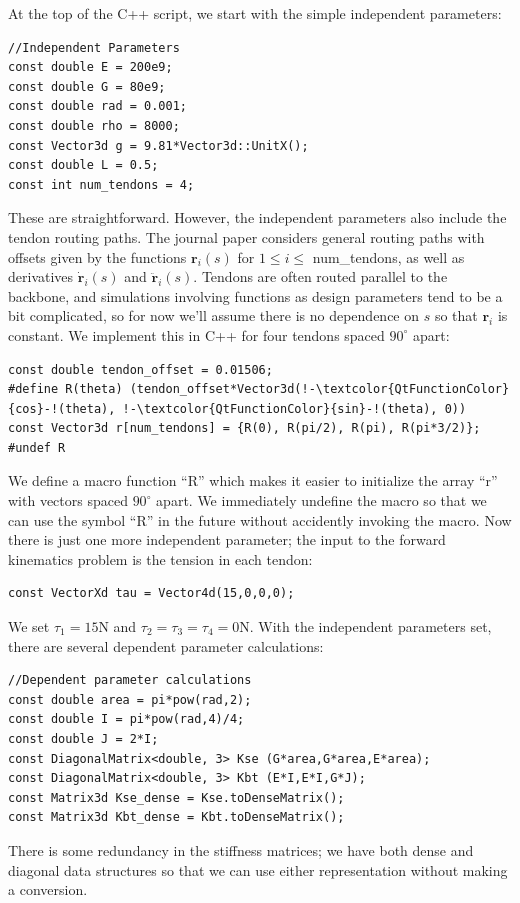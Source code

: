 \documentclass[12pt]{article}
\begin{document}
At the top of the C++ script, we start with the simple independent parameters:
\begin{lstlisting}
//Independent Parameters
const double E = 200e9;
const double G = 80e9;
const double rad = 0.001;
const double rho = 8000;
const Vector3d g = 9.81*Vector3d::UnitX();
const double L = 0.5;
const int num_tendons = 4;
\end{lstlisting}
These are straightforward. However, the independent parameters also include the tendon routing paths. The journal paper considers general routing paths with offsets given by the functions $\boldsymbol{r}_i(s)$ for $1 \leq i \leq$ num\_tendons, as well as derivatives $\dot{\boldsymbol{r}}_i(s)$ and $\ddot{\boldsymbol{r}}_i(s)$. Tendons are often routed parallel to the backbone, and simulations involving functions as design parameters tend to be a bit complicated, so for now we'll assume there is no dependence on $s$ so that $\boldsymbol{r}_i$ is constant. We implement this in C++ for four tendons spaced $90^\circ$ apart:
\begin{lstlisting}
const double tendon_offset = 0.01506;
#define R(theta) (tendon_offset*Vector3d(!-\textcolor{QtFunctionColor}{cos}-!(theta), !-\textcolor{QtFunctionColor}{sin}-!(theta), 0))
const Vector3d r[num_tendons] = {R(0), R(pi/2), R(pi), R(pi*3/2)};
#undef R
\end{lstlisting}
We define a macro function ``R'' which makes it easier to initialize the array ``r'' with vectors spaced $90^\circ$ apart. We immediately undefine the macro so that we can use the symbol ``R'' in the future without accidently invoking the macro. Now there is just one more independent parameter; the input to the forward kinematics problem is the tension in each tendon:
\begin{lstlisting}
const VectorXd tau = Vector4d(15,0,0,0);
\end{lstlisting}
We set $\tau_1 = 15$N and $\tau_2 = \tau_3 = \tau_4 = 0$N.
With the independent parameters set, there are several dependent parameter calculations:
\begin{lstlisting}
//Dependent parameter calculations
const double area = pi*pow(rad,2);
const double I = pi*pow(rad,4)/4;
const double J = 2*I;
const DiagonalMatrix<double, 3> Kse (G*area,G*area,E*area);
const DiagonalMatrix<double, 3> Kbt (E*I,E*I,G*J);
const Matrix3d Kse_dense = Kse.toDenseMatrix();
const Matrix3d Kbt_dense = Kbt.toDenseMatrix();
\end{lstlisting}
There is some redundancy in the stiffness matrices; we have both dense and diagonal data structures so that we can use either representation without making a conversion.
\end{document}
